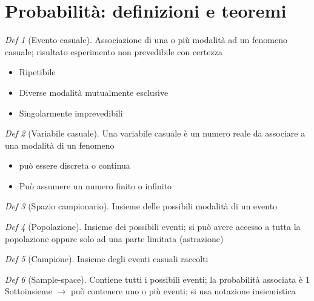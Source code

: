 \documentclass[12pt]{report}
\theoremstyle{remark}
\theoremstyle{theorem}
\newtheorem*{Def}{Def}
\begin{document}
\section[Definizioni e teoremi]{Probabilità: definizioni e teoremi}
\begin{Def}[Evento casuale] \label{ev_casuale} 
	Associazione di una o più modalità ad un fenomeno casuale; risultato esperimento non prevedibile con certezza
	\begin{itemize}
	\item Ripetibile
	\item  Diverse modalità mutualmente esclusive
	\item Singolarmente imprevedibili	
	\end{itemize}
\end{Def}
\begin{Def}[Variabile casuale]\label{var_casuale} 
	Una variabile casuale è un numero reale da associare a una modalità di un fenomeno
	\begin{itemize}
		\item può essere discreta o continua
		\item Può assumere un numero finito o infinito
	\end{itemize}
\end{Def}
\begin{Def}[Spazio campionario]\label{spazio} 
	Insieme delle possibili modalità di un evento
\end{Def}
\begin{Def}[Popolazione]\label{popolazione} 
	Insieme dei possibili eventi; si può avere accesso a tutta la popolazione oppure solo ad una parte limitata (astrazione)
\end{Def}
\begin{Def}[Campione]\label{campione}
	Insieme degli eventi casuali raccolti
\end{Def}
\begin{Def}[Sample-space]\label{space}
	Contiene tutti i possibili eventi; la probabilità associata è 1\newline
	Sottoinsieme $\rightarrow$ può contenere uno o più eventi; si usa notazione insiemistica
\end{Def}
\end{document}
